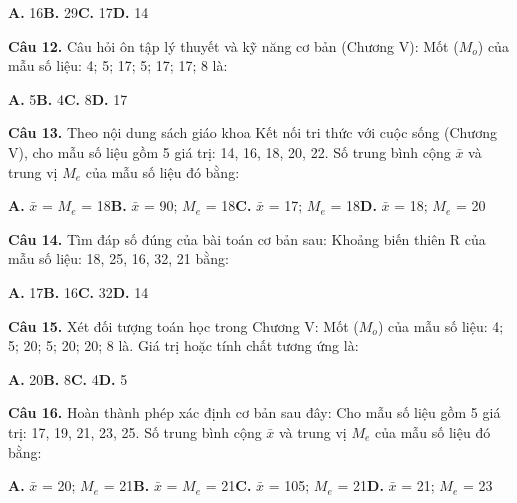 \documentclass[11pt,a4paper]{article}
\begin{document}
\hspace*{1.5em}\textbf{A.} 16\quad\quad \textbf{B.} 29\quad\quad \textbf{C.} 17\quad\quad \textbf{D.} 14\par\vspace{2pt}
\textbf{\color{primary} Câu 12.} Câu hỏi ôn tập lý thuyết và kỹ năng cơ bản (Chương V): Mốt ($M_o$) của mẫu số liệu: 4; 5; 17; 5; 17; 17; 8 là:\par
\hspace*{1.5em}\textbf{A.} 5\quad\quad \textbf{B.} 4\quad\quad \textbf{C.} 8\quad\quad \textbf{D.} 17\par\vspace{2pt}
\textbf{\color{primary} Câu 13.} Theo nội dung sách giáo khoa Kết nối tri thức với cuộc sống (Chương V), cho mẫu số liệu gồm 5 giá trị: 14, 16, 18, 20, 22. Số trung bình cộng $\bar{x}$ và trung vị $M_e$ của mẫu số liệu đó bằng:\par
\hspace*{1.5em}\textbf{A.} $\bar{x}$ = $M_e$ = 18\quad\quad \textbf{B.} $\bar{x}$ = 90; $M_e$ = 18\quad\quad \textbf{C.} $\bar{x}$ = 17; $M_e$ = 18\quad\quad \textbf{D.} $\bar{x}$ = 18; $M_e$ = 20\par\vspace{2pt}
\textbf{\color{primary} Câu 14.} Tìm đáp số đúng của bài toán cơ bản sau: Khoảng biến thiên R của mẫu số liệu: 18, 25, 16, 32, 21 bằng:\par
\hspace*{1.5em}\textbf{A.} 17\quad\quad \textbf{B.} 16\quad\quad \textbf{C.} 32\quad\quad \textbf{D.} 14\par\vspace{2pt}
\textbf{\color{primary} Câu 15.} Xét đối tượng toán học trong Chương V: Mốt ($M_o$) của mẫu số liệu: 4; 5; 20; 5; 20; 20; 8 là. Giá trị hoặc tính chất tương ứng là:\par
\hspace*{1.5em}\textbf{A.} 20\quad\quad \textbf{B.} 8\quad\quad \textbf{C.} 4\quad\quad \textbf{D.} 5\par\vspace{2pt}
\textbf{\color{primary} Câu 16.} Hoàn thành phép xác định cơ bản sau đây: Cho mẫu số liệu gồm 5 giá trị: 17, 19, 21, 23, 25. Số trung bình cộng $\bar{x}$ và trung vị $M_e$ của mẫu số liệu đó bằng:\par
\hspace*{1.5em}\textbf{A.} $\bar{x}$ = 20; $M_e$ = 21\quad\quad \textbf{B.} $\bar{x}$ = $M_e$ = 21\quad\quad \textbf{C.} $\bar{x}$ = 105; $M_e$ = 21\quad\quad \textbf{D.} $\bar{x}$ = 21; $M_e$ = 23\par\vspace{2pt}
\end{document}
